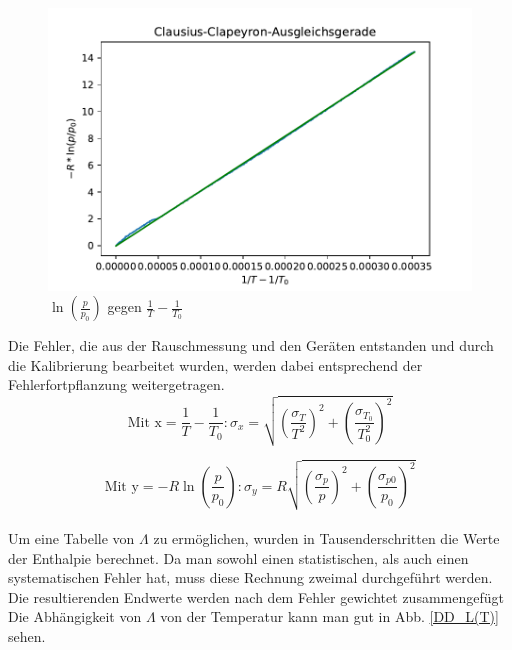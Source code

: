 \documentclass[]{article}
\begin{document}
	\begin{figure}
		\begin{center}
			\includegraphics[scale=0.9]{Images/Dampfdruck_ln.pdf}
			\caption{$\ln(\frac{p}{p_0})$ gegen $\frac{1}{T} - \frac{1}{T_0}$}
			\label{DD_ln-1}
		\end{center}
	\end{figure}
	Die Fehler, die aus der Rauschmessung und den Geräten entstanden und durch die Kalibrierung bearbeitet wurden, werden dabei entsprechend der Fehlerfortpflanzung weitergetragen.
	\begin{equation}
	\text{Mit x} = \frac{1}{T} - \frac{1}{T_0}:
	\sigma_x = \sqrt{\left(\frac{\sigma_T}{T^2}\right)^2+\left(\frac{\sigma_{T_0}}{T_0^2}\right)^2}
	\end{equation}
	
	\begin{equation}
	\text{Mit y} = -R\ln\left(\frac{p}{p_0}\right):
	\sigma_y = R \sqrt{\left(\frac{\sigma_p}{p}\right)^2 +\left(\frac{\sigma_{p0}}{p_0}\right)^2 }
	\end{equation}
\\
	Um eine Tabelle von $\Lambda$ zu ermöglichen, wurden in Tausenderschritten die Werte der Enthalpie berechnet. Da man sowohl einen statistischen, als auch einen systematischen Fehler hat, muss diese Rechnung zweimal durchgeführt werden. Die resultierenden Endwerte werden nach dem Fehler gewichtet zusammengefügt 
	Die Abhängigkeit von $\Lambda$ von der Temperatur kann man gut in Abb. \ref{DD_L(T)} sehen.	
		
\end{document}
